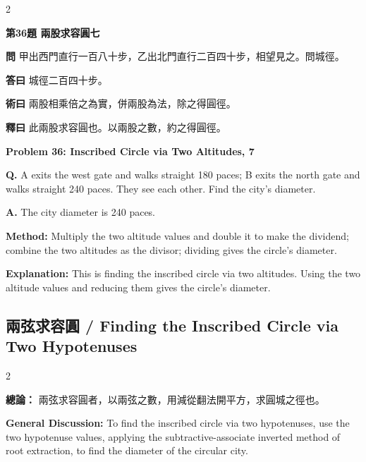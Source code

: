 \documentclass[11pt,a4paper]{article}
\newcommand{\wen}[1]{\noindent\textbf{問} #1\par\smallskip}
\newcommand{\da}[1]{\noindent\textbf{答曰} #1\par\smallskip}
\newcommand{\shu}[1]{\noindent\textbf{術曰} #1\par\smallskip}
\newcommand{\shi}[1]{\noindent\textbf{釋曰} #1\par\smallskip}
\newcommand{\wenE}[1]{\noindent\textbf{Q.} #1\par\smallskip}
\newcommand{\daE}[1]{\noindent\textbf{A.} #1\par\smallskip}
\newcommand{\shuE}[1]{\noindent\textbf{Method:} #1\par\smallskip}
\newcommand{\shiE}[1]{\noindent\textbf{Explanation:} #1\par\smallskip}
\begin{document}
\begin{paracol}{2}

\noindent\textbf{第36題 兩股求容圓七}

\wen{甲出西門直行一百八十步，乙出北門直行二百四十步，相望見之。問城徑。}
\da{城徑二百四十步。}
\shu{兩股相乘倍之為實，併兩股為法，除之得圓徑。}
\shi{此兩股求容圓也。以兩股之數，約之得圓徑。}

\switchcolumn

\noindent\textbf{Problem 36: Inscribed Circle via Two Altitudes, 7}

\wenE{A exits the west gate and walks straight 180 paces; B exits the north gate and walks straight 240 paces. They see each other. Find the city's diameter.}
\daE{The city diameter is 240 paces.}
\shuE{Multiply the two altitude values and double it to make the dividend; combine the two altitudes as the divisor; dividing gives the circle's diameter.}
\shiE{This is finding the inscribed circle via two altitudes. Using the two altitude values and reducing them gives the circle's diameter.}

\end{paracol}

\clearpage

\subsection*{兩弦求容圓 / Finding the Inscribed Circle via Two Hypotenuses}

\begin{paracol}{2}

\noindent\textbf{總論：} 兩弦求容圓者，以兩弦之數，用減從翻法開平方，求圓城之徑也。

\switchcolumn

\noindent\textbf{General Discussion:} To find the inscribed circle via two hypotenuses, use the two hypotenuse values, applying the subtractive-associate inverted method of root extraction, to find the diameter of the circular city.

\end{paracol}

\bigskip
\end{document}
